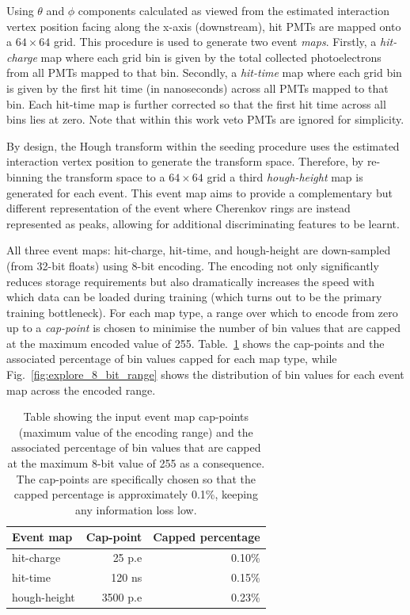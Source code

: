 Using $\theta$ and $\phi$ components calculated as viewed from the estimated interaction vertex
position facing along the x-axis (downstream), hit PMTs are mapped onto a $64 \times 64$ grid.
This procedure is used to generate two event \emph{maps}. Firstly, a \emph{hit-charge} map where
each grid bin is given by the total collected photoelectrons from all PMTs mapped to that bin.
Secondly, a \emph{hit-time} map where each grid bin is given by the first hit time (in
nanoseconds) across all PMTs mapped to that bin. Each hit-time map is further corrected so that
the first hit time across all bins lies at zero. Note that within this work veto PMTs are ignored
for simplicity.

By design, the Hough transform within the seeding procedure uses the estimated interaction vertex
position to generate the transform space. Therefore, by re-binning the transform space to a $64
\times 64$ grid a third \emph{hough-height} map is generated for each event. This event map aims
to provide a complementary but different representation of the event where Cherenkov rings are
instead represented as peaks, allowing for additional discriminating features to be learnt.

All three event maps: hit-charge, hit-time, and hough-height are down-sampled (from 32-bit floats)
using 8-bit encoding. The encoding not only significantly reduces storage requirements but also
dramatically increases the speed with which data can be loaded during training (which turns out to
be the primary training bottleneck). For each map type, a range over which to encode from zero up
to a \emph{cap-point} is chosen to minimise the number of bin values that are capped at the
maximum encoded value of 255. Table.~\ref{tab:encoding} shows the cap-points and the associated
percentage of bin values capped for each map type, while Fig.~\ref{fig:explore_8_bit_range} shows
the distribution of bin values for each event map across the encoded range.

\begin{table}
    \begin{tabular}{lrr}
        Event map    & Cap-point & Capped percentage \\
        \midrule
        hit-charge   & 25 p.e    & 0.10\%            \\
        hit-time     & 120 ns    & 0.15\%            \\
        hough-height & 3500 p.e  & 0.23\%            \\
    \end{tabular}
    \caption[Table of input event map 8-bit cap-points and percentages]
    {Table showing the input event map cap-points (maximum value of the encoding range) and the
        associated percentage of bin values that are capped at the maximum 8-bit value of 255 as a
        consequence. The cap-points are specifically chosen so that the capped percentage is
        approximately 0.1\%, keeping any information loss low.}
    \label{tab:encoding}
\end{table}

